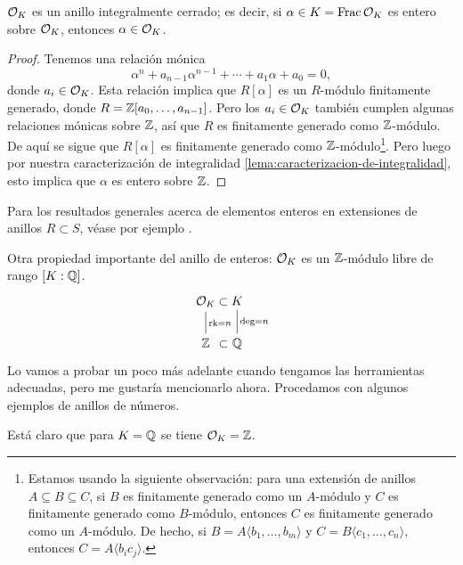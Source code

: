 \begin{proposicion}
  $\mathcal{O}_K$ es un anillo integralmente cerrado; es decir, si
  $\alpha\in K = \operatorname{Frac}\mathcal{O}_K$ es entero sobre $\mathcal{O}_K$, entonces
  $\alpha \in \mathcal{O}_K$.

  \begin{proof}
    Tenemos una relación mónica
    $$\alpha^n + a_{n-1} \alpha^{n-1} + \cdots + a_1 \alpha + a_0 = 0,$$
    donde $a_i \in \mathcal{O}_K$. Esta relación implica que $R [\alpha]$
    es un $R$-módulo finitamente generado, donde
    $R = \mathbb{Z} [a_0,\ldots,a_{n-1}]$. Pero los $a_i\in \mathcal{O}_K$ también cumplen
    algunas relaciones mónicas sobre $\mathbb{Z}$, así que $R$ es finitamente
    generado como $\mathbb{Z}$-módulo. De aquí se sigue que $R [\alpha]$
    es finitamente generado como $\mathbb{Z}$-módulo\footnote{Estamos usando la
      siguiente observación: para una extensión de anillos
      $A \subseteq B \subseteq C$, si $B$ es finitamente generado como un
      $A$-módulo y $C$ es finitamente generado como $B$-módulo, entonces
      $C$ es finitamente generado como un $A$-módulo. De hecho, si
      $B = A\langle b_1,\ldots,b_m\rangle$ y
      $C = B\langle c_1,\ldots,c_n\rangle$, entonces
      $C = A\langle b_i c_j \rangle$.}.
    Pero luego por nuestra caracterización de integralidad
    \ref{lema:caracterizacion-de-integralidad}, esto implica que $\alpha$ es
    entero sobre $\mathbb{Z}$.
  \end{proof}
\end{proposicion}

Para los resultados generales acerca de elementos enteros en extensiones de
anillos $R \subset S$, véase por ejemplo \cite[Chapter~5]{Atiyah-Macdonald}.

Otra propiedad importante del anillo de enteros: $\mathcal{O}_K$ es un $\mathbb{Z}$-módulo libre
de rango $[K : \mathbb{Q}]$.
\[ \begin{tikzcd}
  \O_K \ar[-]{d}{\rk = n} &[-3em] \subset &[-3em] K \ar[-]{d}{\deg = n} \\
  \ZZ & \subset & \QQ
\end{tikzcd} \]
Lo vamos a probar un poco más adelante cuando tengamos las herramientas
adecuadas, pero me gustaría mencionarlo ahora. Procedamos con algunos ejemplos
de anillos de números.

\begin{ejemplo}
  Está claro que para $K = \mathbb{Q}$ se tiene $\mathcal{O}_K = \mathbb{Z}$.
\end{ejemplo}


